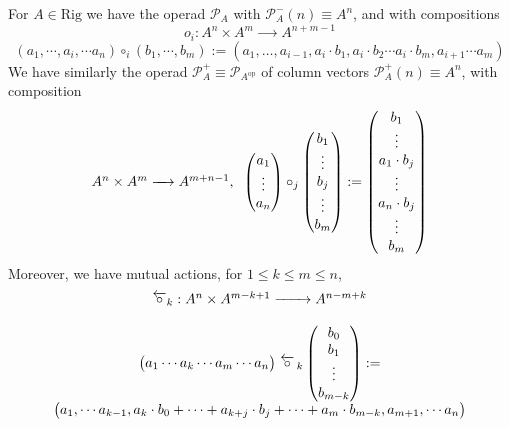 \documentclass[leqno]{article}
\newcommand{\biop}{\mathscr{P}}
\newcommand{\circleftarrow}{\,\overleftarrow{\circ}\,}
\numberwithin{equation}{section}
\begin{document}
\vspace{.1cm}
For $A\in \text{Rig}$ we have the operad $\biop_{A}$ 
with $\biop_{A}^{-}(n)\equiv A^{n}$, and with compositions 
\begin{equation}
				o_{i}: A^{n}\times A^{m} \xrightarrow{\qquad} A^{n+m-1}
				\label{eq:2.10}
\end{equation}
\begin{equation*}
				(a_1,\cdots , a_{i}, \cdots a_{n})\circ_{i}(b_1,\cdots , b_{m}):= (a_1,\ldots,
				a_{i-1},a_{i}\cdot b_{1},a_{i}\cdot b_2 \cdots a_i\cdot b_{m},a_{i+1}\cdots
a_{m})
\end{equation*}
We have similarly the operad $\biop_{A}^{+}\equiv \biop_{A^{\text{op}}}$ of column vectors 
$\biop_{A}^{+}(n)\equiv A^{n}$, with composition 
\begin{equation}
				\begin{array}[H]{c}
								A^{n}\times A^{m}\xrightarrow{\quad} A^{m+n-1}, \;\;
				\begin{pmatrix}
								a_1 \\ \vdots \\ a_n
				\end{pmatrix} \circ_j 
				\begin{pmatrix}
								b_1 \\ \vdots \\ b_{j}\\ \vdots \\ b_m
				\end{pmatrix} := 
				\begin{pmatrix}
								b_1 \\ \vdots \\ a_1\cdot b_{j} \\ \vdots \\ a_n\cdot b_{j} \\  \vdots \\
								b_{m}
				\end{pmatrix}
				\end{array}
				\label{eq:2.11}
\end{equation}
Moreover, we have mutual actions, for $1\le k\le m\le n$, 
\begin{equation}
				\begin{array}[H]{c}
								\overleftarrow{\circ}_{k}: A^{n}\times A^{m-k+1} \xrightarrow{\qquad} A^{n-m+k} \\\\
\begin{pmatrix}
				a_1\cdots a_k\cdots a_m\cdots a_n
\end{pmatrix} \circleftarrow_{k} 
\begin{pmatrix}
				b_0\\ b_1 \\ \vdots \\ b_{m-k} 
\end{pmatrix} := 
\\
\begin{pmatrix}
				a_1, \cdots a_{k-1}, a_{k}\cdot b_0+\cdots + a_{k+j}\cdot b_j+\cdots +
				a_{m}\cdot b_{m-k}, a_{m+1},\cdots a_n
\end{pmatrix}
				\end{array}
				\label{eq:2.12}
\end{equation}
\end{document}

